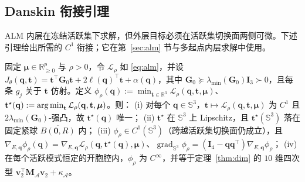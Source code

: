 \subsection{Danskin 衔接引理}\label{app:danskin}
ALM 内层在冻结活跃集下求解，但外层目标必须在活跃集切换面两侧可微。下述引理给出所需的 $C^1$ 衔接；它在第~\ref{sec:alm} 节与多起点内层求解中使用。
\begin{lemma}\label{lem:danskin}
固定 $\boldsymbol\mu\in\mathbb{R}^p_{\ge0}$ 与 $\rho>0$，令 $\mathcal L_\rho$ 如 \eqref{eq:alm}，并设 $J_\theta(\mathbf q,\mathbf t)=\mathbf t^\top\mathbf G_0\mathbf t+2\boldsymbol\ell(\mathbf q)^\top\mathbf t+\alpha(\mathbf q)$，其中 $\mathbf G_0\succeq\lambda_{\min}(\mathbf G_0)\mathbf I_3\succ0$，且每条 $g_j$ 关于 $\mathbf t$ 仿射。定义 $\phi_\rho(\mathbf q):=\min_{\mathbf t\in\mathbb{R}^3}\mathcal L_\rho(\mathbf q,\mathbf t,\boldsymbol\mu)$、$\mathbf t^\star(\mathbf q):=\operatorname*{arg\,min}_{\mathbf t}\mathcal L_\rho(\mathbf q,\mathbf t,\boldsymbol\mu)$。则：
(i) 对每个 $\mathbf q\in\mathbb S^3$，$\mathbf t\mapsto\mathcal L_\rho(\mathbf q,\mathbf t,\boldsymbol\mu)$ 为 $C^1$ 且 $2\lambda_{\min}(\mathbf G_0)$-强凸，故 $\mathbf t^\star(\mathbf q)$ 唯一；
(ii) $\mathbf t^\star$ 在 $\mathbb S^3$ 上 Lipschitz，且 $\mathbf t^\star(\mathbb S^3)$ 落在固定紧球 $\overline{B(\mathbf 0,R)}$ 内；
(iii) $\phi_\rho\in C^1(\mathbb S^3)$（跨越活跃集切换面仍成立），且 $\nabla_{E,\mathbf q}\phi_\rho(\mathbf q)=\nabla_{E,\mathbf q}\mathcal L_\rho(\mathbf q,\mathbf t^\star(\mathbf q),\boldsymbol\mu)$、$\operatorname{grad}_{\mathbb S^3}\phi_\rho=(\mathbf I_4-\mathbf q\mathbf q^\top)\nabla_{E,\mathbf q}\phi_\rho$；
(iv) 在每个活跃模式恒定的开胞腔内，$\phi_\rho$ 为 $C^\infty$，并等于定理~\ref{thm:dim} 的 $10$ 维四次型 $\mathbf v_2^\top\mathbf M_{\mathcal A}\mathbf v_2+\kappa_{\mathcal A}$。
\end{lemma}
